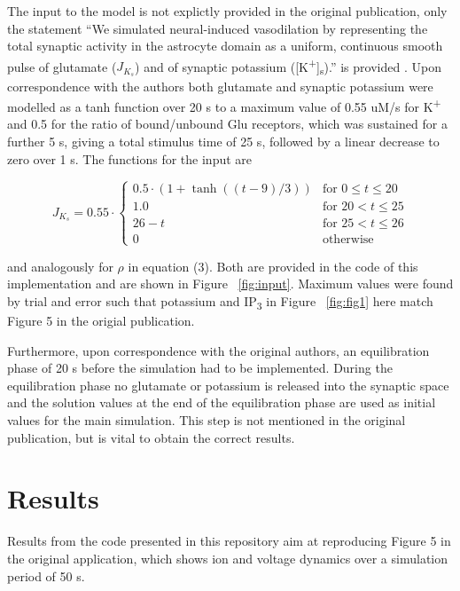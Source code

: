 \documentclass[10pt,a4paper,onecolumn]{article}
\begin{document}
The input to the model is not explictly provided in the original
publication, only the statement ``We simulated neural-induced
vasodilation by representing the total synaptic activity in the
astrocyte domain as a uniform, continuous smooth pulse of glutamate
(\(J_{K_s}\)) and of synaptic potassium
({[}K\textsuperscript{+}{]}\textsubscript{s}).'' is provided
\autocite{Witthoft2012}. Upon correspondence with the authors both
glutamate and synaptic potassium were modelled as a tanh function over
20 s to a maximum value of 0.55 uM/s for K\textsuperscript{+} and 0.5
for the ratio of bound/unbound Glu receptors, which was sustained for a
further 5 s, giving a total stimulus time of 25 s, followed by a linear
decrease to zero over 1 s. The functions for the input are

\[J_{K_s} = 0.55 \cdot \begin{cases} 0.5 \cdot (1 + \tanh((t-9)/3)) & \text{for } 0 \leq t \leq 20\\
1.0 & \text{for } 20 < t \leq 25\\
26 - t & \text{for } 25 < t \leq 26\\
0 & \text{otherwise}\end{cases}\]

and analogously for \(\rho\) in equation (3). Both are provided in the
code of this implementation and are shown in Figure ~\ref{fig:input}.
Maximum values were found by trial and error such that potassium and
IP\textsubscript{3} in Figure ~\ref{fig:fig1} here match Figure 5 in the
origial publication.

Furthermore, upon correspondence with the original authors, an
equilibration phase of 20 s before the simulation had to be implemented.
During the equilibration phase no glutamate or potassium is released
into the synaptic space and the solution values at the end of the
equilibration phase are used as initial values for the main simulation.
This step is not mentioned in the original publication, but is vital to
obtain the correct results.

\section{Results}\label{results}

Results from the code presented in this repository aim at reproducing
Figure 5 in the original application, which shows ion and voltage
dynamics over a simulation period of 50 s.
\end{document}
